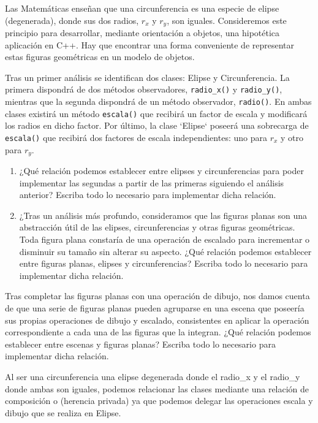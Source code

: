  Las Matemáticas enseñan que una circunferencia es una especie de elipse (degenerada), donde sus dos radios, $r_{x}$ y $r_y$, son iguales. Consideremos este principio para desarrollar, mediante orientación a objetos, una hipotética aplicación en C++. Hay que encontrar una forma conveniente de representar estas figuras geométricas en un modelo de objetos.

Tras un primer análisis se identifican dos clases: Elipse y Circunferencia. La primera dispondrá de dos métodos observadores, \texttt{radio\_x()} y \texttt{radio\_y()}, mientras que la segunda dispondrá de un método observador, \texttt{radio()}. En ambas clases existirá un método \texttt{escala()} que recibirá un factor de escala y modificará los radios en dicho factor. Por último, la clase `Elipse` poseerá una sobrecarga de \texttt{escala()} que recibirá dos factores de escala independientes: uno para $r_x$ y otro para $r_y$.

\begin{enumerate}[label=\alph*)]
    \item¿Qué relación podemos establecer entre elipses y circunferencias para poder implementar las segundas a partir de las primeras siguiendo el análisis anterior? Escriba todo lo necesario para implementar dicha relación.
    
    \item ¿Tras un análisis más profundo, consideramos que las figuras planas son una abstracción útil de las elipses, circunferencias y otras figuras geométricas. Toda figura plana constaría de una operación de escalado para incrementar o disminuir su tamaño sin alterar su aspecto. ¿Qué relación podemos establecer entre figuras planas, elipses y circunferencias? Escriba todo lo necesario para implementar dicha relación.
\end{enumerate}

Tras completar las figuras planas con una operación de dibujo, nos damos cuenta de que una serie de figuras planas pueden agruparse en una escena que poseería sus propias operaciones de dibujo y escalado, consistentes en aplicar la operación correspondiente a cada una de las figuras que la integran. ¿Qué relación podemos establecer entre escenas y figuras planas? Escriba todo lo necesario para implementar dicha relación.


Al ser una circunferencia una elipse degenerada donde el radio\_x y el radio\_y donde ambas son iguales, podemos relacionar las clases mediante una relación de composición o (herencia privada) ya que podemos delegar las operaciones escala y dibujo que se realiza en Elipse.

